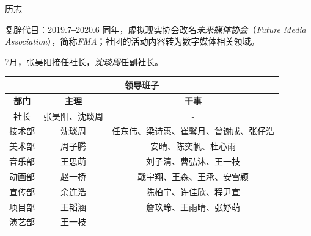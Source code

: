 \documentclass{paper}
\newcommand{\name}[1]{{\em #1}}
\renewcommand{\thead}[1]{\textbf{ #1}}
\begin{document}
\begin{section}{历志}
\begin{subsection}{复辟代目：2019.7‒2020.6}
		同年，虚拟现实协会改名\name{未来媒体协会}（\name{Future Media Association}），简称\name{FMA}；社团的活动内容转为数字媒体相关领域。

		7月，张昊阳接任社长，\name{沈琰周}任副社长。

		\begin{table}[H]\begin{center}
			\begin{tabular}{|c|c|c|}
				\hline
				\multicolumn{3}{|c|}{\thead{领导班子}} \\ \hline
				\thead{部门} & \thead{主理} & \thead{干事} \\ \hline
				社长 & 张昊阳、沈琰周 & - \\ \hline
				技术部 & 沈琰周 & 任东伟、梁诗惠、崔馨月、曾谢成、张仔浩 \\ \hline
				美术部 & 周子腾 & 安晴、陈奕帆、杜心雨 \\ \hline
				音乐部 & 王思萌 & 刘子清、曹弘沐、王一枝 \\ \hline
				动画部 & 赵一桥 & 戢宇翔、王森、王承、安雪颖 \\ \hline
				宣传部 & 余连浩 &  陈柏宇、许佳欣、程尹宣 \\ \hline
				项目部 & 王韬涵 & 詹玖玲、王雨晴、张妤萌 \\ \hline
				演艺部\tablefootnote{
					后新建。
				} & 王一枝 & - \\ \hline
			\end{tabular}
		\end{center}\end{table}


\end{subsection}
\end{section}
\end{document}
